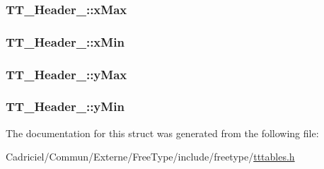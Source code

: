 \hypertarget{struct_t_t___header___a593b9cc3e11532972a7fc96944dd1ae9}{
\subsubsection[{x\-Max}]{ T\-T\-\_\-\-Header\-\_\-\-::x\-Max}}\label{struct_t_t___header___a593b9cc3e11532972a7fc96944dd1ae9}
\hypertarget{struct_t_t___header___ae4553d76427d9f7a28595ed71897dcbb}{
\subsubsection[{x\-Min}]{ T\-T\-\_\-\-Header\-\_\-\-::x\-Min}}\label{struct_t_t___header___ae4553d76427d9f7a28595ed71897dcbb}
\hypertarget{struct_t_t___header___a02d236cd8150c00e886a0c487c04dffa}{
\subsubsection[{y\-Max}]{ T\-T\-\_\-\-Header\-\_\-\-::y\-Max}}\label{struct_t_t___header___a02d236cd8150c00e886a0c487c04dffa}
\hypertarget{struct_t_t___header___ac6aad4966bac8a96c5bc48765b3d694a}{
\subsubsection[{y\-Min}]{ T\-T\-\_\-\-Header\-\_\-\-::y\-Min}}\label{struct_t_t___header___ac6aad4966bac8a96c5bc48765b3d694a}


The documentation for this struct was generated from the following file\-:\begin{DoxyCompactItemize}
\item 
Cadriciel/\-Commun/\-Externe/\-Free\-Type/include/freetype/\hyperlink{tttables_8h}{tttables.\-h}\end{DoxyCompactItemize}
